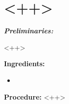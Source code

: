 \section{<++>} %
\textbf{\large{\emph{Preliminaries:}}}

<++>

\begin{multicols}{2}\raggedcolumns
\textbf{Ingredients:}

\begin{itemize}
	\item <++>
\end{itemize}

\columnbreak

\textbf{Procedure:}
<++>

\end{multicols}
